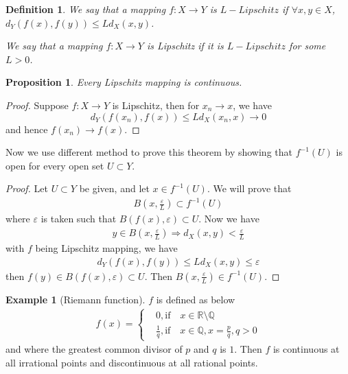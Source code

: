 \documentclass[12pt,leqno]{amsart}
\newtheorem{definition}{Definition}[section]
\newtheorem{proposition}{Proposition}[section]
\theoremstyle{definition}
\newtheorem{example}{Example}[section]
\numberwithin{equation}{subsection}
\begin{document}
\medskip

\begin{definition}
We say that a mapping $f:X\to Y$ is $L-Lipschitz$ if $\forall x,y\in X$, $d_Y(f(x),f(y))\leq L d_X(x,y)$. 

We say that a mapping $f:X\to Y$ is Lipschitz if it is $L-Lipschitz$ for some $L>0$.
\end{definition}

\medskip

\begin{proposition}
Every Lipschitz mapping is continuous.
\end{proposition}
\begin{proof}
Suppose $f:X\to Y$ is Lipschitz, then for $x_n\to x$, we have $$d_Y(f(x_n),f(x))\leq L d_X(x_n,x)\to 0$$ 
and hence $f(x_n)\to f(x)$.
\end{proof}
Now we use different method to prove this theorem by showing that $f^{-1}(U)$ is open for every open set $U\subset Y$.
\begin{proof}
Let $U\subset Y$ be given, and let $x\in f^{-1}(U)$. We will prove that 
\begin{align*}
    B\left(x, \frac{\varepsilon}{L}\right)\subset f^{-1}(U)
\end{align*}
where $\varepsilon$ is taken such that $B(f(x),\varepsilon)\subset U$. Now we have
\begin{align*}
    y\in B\left(x, \frac{\varepsilon}{L}\right) \Rightarrow d_X(x,y) < \frac{\varepsilon}{L}
\end{align*}
with $f$ being Lipschitz mapping, we have 
\begin{align*}
    d_Y(f(x),f(y))\leq L d_X(x,y) \leq \varepsilon
\end{align*}
then $f(y)\in B(f(x),\varepsilon)\subset U$. Then $B\left(x, \frac{\varepsilon}{L}\right)\in f^{-1}(U)$.
\end{proof}

\medskip

\begin{example}[Riemann function]
$f$ is defined as below
\begin{align*}
    f(x) = \left\{
    \begin{aligned}
    & 0, \text{if} \quad x \in \mathbb{R}\setminus\mathbb{Q}\\
    & \frac{1}{q}, \text{if} \quad x \in \mathbb{Q}, x = \frac{p}{q}, q > 0
    \end{aligned}
    \right.
\end{align*}
and where the greatest common divisor of $p$ and $q$ is $1$. Then $f$ is continuous at all irrational points and discontinuous at all rational points.
\end{example}
\end{document}
